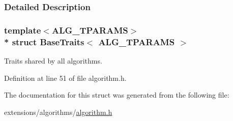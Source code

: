 \subsubsection{Detailed Description}
\subsubsection*{template$<$A\+L\+G\+\_\+\+T\+P\+A\+R\+A\+MS$>$\\*
struct Base\+Traits$<$ A\+L\+G\+\_\+\+T\+P\+A\+R\+A\+M\+S $>$}

Traits shared by all algorithms. 

Definition at line 51 of file algorithm.\+h.



The documentation for this struct was generated from the following file\+:\begin{DoxyCompactItemize}
\item 
extensions/algorithms/\hyperlink{algorithm_8h}{algorithm.\+h}\end{DoxyCompactItemize}
